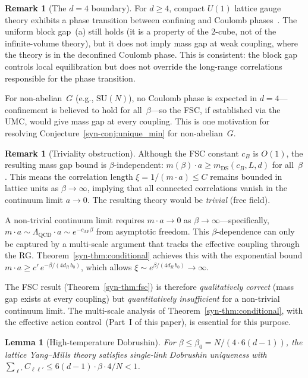 \documentclass[11pt]{article}
\newtheorem{lemma}[theorem]{Lemma}
\theoremstyle{definition}
\newtheorem{remark}[theorem]{Remark}
\newcommand{\SU}{\mathrm{SU}}
\begin{document}
\begin{remark}[The $d = 4$ boundary]
\label{syn-rem:U1_d4}
For $d \geq 4$, compact $U(1)$ lattice gauge theory
exhibits a phase transition between confining and Coulomb
phases~\cite{Guth80}.  The uniform block gap~(a) still holds
(it is a property of the $2$-cube, not of the
infinite-volume theory), but it does not imply mass gap at
weak coupling, where the theory is in the deconfined Coulomb
phase.  This is consistent: the block gap controls local
equilibration but does not override the long-range
correlations responsible for the phase transition.

For non-abelian~$G$ (e.g., $\SU(N)$), no Coulomb phase is
expected in $d = 4$---confinement is believed to hold for
all~$\beta$---so the FSC, if established via the UMC,
would give mass gap at every coupling.  This is one
motivation for resolving Conjecture~\ref{syn-conj:unique_min}
for non-abelian~$G$.
\end{remark}

\begin{remark}[Triviality obstruction]\label{syn-rem:triviality}
Although the FSC constant $c_B$ is $O(1)$, the resulting
mass gap bound is $\beta$-independent:
$m(\beta) \cdot a \geq m_{\mathrm{DS}}(c_B, L, d)$
for all~$\beta$.  This means the correlation length
$\xi = 1/(m \cdot a) \leq C$ remains bounded in lattice
units as $\beta \to \infty$, implying that all connected
correlations vanish in the continuum limit $a \to 0$.
The resulting theory would be \emph{trivial} (free field).

A non-trivial continuum limit requires
$m \cdot a \to 0$ as $\beta \to \infty$---specifically,
$m \cdot a \sim \Lambda_{\mathrm{QCD}} \cdot a
\sim e^{-c_{\mathrm{AF}} \beta}$ from asymptotic freedom.
This $\beta$-dependence can only be captured by a
multi-scale argument that tracks the effective coupling
through the RG.  Theorem~\ref{syn-thm:conditional} achieves
this with the exponential bound
$m \cdot a \geq c'\,e^{-\beta/(4d_R\,b_0)}$,
which allows $\xi \sim e^{\beta/(4d_R\,b_0)} \to \infty$.

The FSC result (Theorem~\ref{syn-thm:fsc}) is therefore
\emph{qualitatively correct} (mass gap exists at every
coupling) but \emph{quantitatively insufficient} for a non-trivial
continuum limit.  The multi-scale analysis of
Theorem~\ref{syn-thm:conditional}, with the effective action
control~(Part~I of this paper), is essential for this purpose.
\end{remark}

\begin{lemma}[High-temperature Dobrushin]\label{syn-lem:high_temp_dob}
For $\beta \leq \beta_0 = N/(4 \cdot 6(d{-}1))$, the lattice
Yang--Mills theory satisfies single-link Dobrushin uniqueness
with $\sum_{\ell'} C_{\ell\ell'} \leq 6(d{-}1) \cdot \beta
\cdot 4/N < 1$.
\end{lemma}
\end{document}

